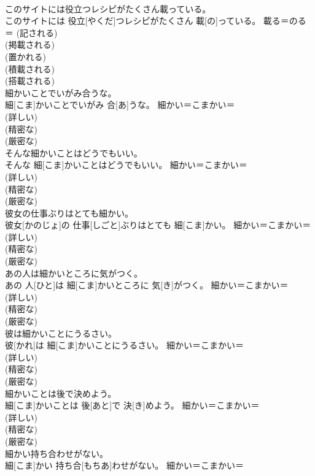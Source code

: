 \documentclass[8pt]{extreport}
\begin{document}
\begin{CJK}{UTF8}{min}
{\\	このサイトには役立つレシピがたくさん載っている。	
\\	このサイトには 役立[やくだ]つレシピがたくさん 載[の]っている。	載る＝のる＝ (記される) 
\\	(掲載される) 
\\	(置かれる) 
\\	(積載される) 
\\	(搭載される) 
\\	細かいことでいがみ合うな。	
\\	細[こま]かいことでいがみ 合[あ]うな。	細かい＝こまかい＝ 
\\	(詳しい) 
\\	(精密な) 
\\	(厳密な) 
\\	そんな細かいことはどうでもいい。	
\\	そんな 細[こま]かいことはどうでもいい。	細かい＝こまかい＝ 
\\	(詳しい) 
\\	(精密な) 
\\	(厳密な) 
\\	彼女の仕事ぶりはとても細かい。	
\\	彼女[かのじょ]の 仕事[しごと]ぶりはとても 細[こま]かい。	細かい＝こまかい＝ 
\\	(詳しい) 
\\	(精密な) 
\\	(厳密な) 
\\	あの人は細かいところに気がつく。	
\\	あの 人[ひと]は 細[こま]かいところに 気[き]がつく。	細かい＝こまかい＝ 
\\	(詳しい) 
\\	(精密な) 
\\	(厳密な) 
\\	彼は細かいことにうるさい。	
\\	彼[かれ]は 細[こま]かいことにうるさい。	細かい＝こまかい＝ 
\\	(詳しい) 
\\	(精密な) 
\\	(厳密な) 
\\	細かいことは後で決めよう。	
\\	細[こま]かいことは 後[あと]で 決[き]めよう。	細かい＝こまかい＝ 
\\	(詳しい) 
\\	(精密な) 
\\	(厳密な) 
\\	細かい持ち合わせがない。	
\\	細[こま]かい 持ち合[もちあ]わせがない。	細かい＝こまかい＝ 
}
\end{CJK}
\end{document}
